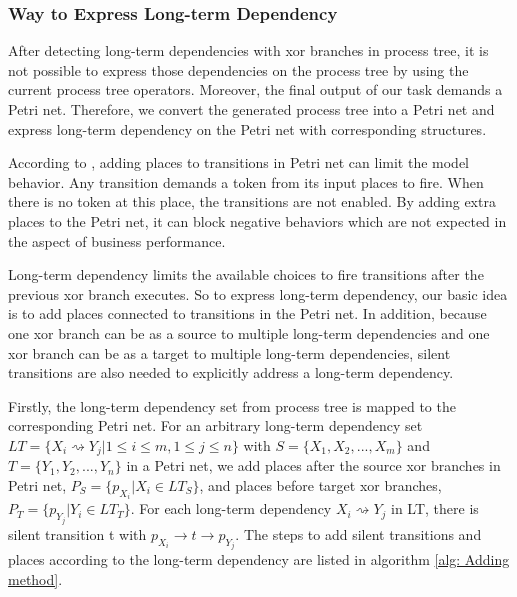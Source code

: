 \subsubsection{Way to Express Long-term Dependency}
After detecting long-term dependencies with xor branches in process tree, it is not possible to express those dependencies on the process tree by using the current process tree operators. Moreover, the final output of our task demands a Petri net. Therefore, we convert the generated process tree into a Petri net and express long-term dependency on the Petri net with corresponding structures.

According to \cite{bergenthum2007process}, adding places to transitions in Petri net can limit the model behavior. Any transition demands a token from its input places to fire. When there is no token at this place, the transitions are not enabled. By adding extra places to the Petri net, it can block negative behaviors which are not expected in the aspect of business performance. 

Long-term dependency limits the available choices to fire transitions after the previous xor branch executes. So to express long-term dependency, our basic idea is to add places connected to transitions in the Petri net. In addition, because one xor branch can be as a source to multiple long-term dependencies and one xor branch can be as a target to multiple long-term dependencies, silent transitions are also needed to explicitly address a long-term dependency. 


Firstly, the long-term dependency set from process tree is mapped to the corresponding Petri net. For an arbitrary long-term dependency set $LT=\{X_i \rightsquigarrow Y_j \vert 1 \leq i \leq m, 1 \leq j \leq n \}$ with $S=\{X_1,X_2,...,X_m\}$ and $T=\{Y_1,Y_2,...,Y_n\}$ in a Petri net, we add places after the source xor branches in Petri net,  $P_S=\{p_{X_i} \vert X_i \in LT_{S} \}$, and places before target xor branches,$P_T=\{p_{Y_j} \vert Y_i \in LT_{T} \}$. For each long-term dependency $X_{i} \rightsquigarrow Y_{j}$ in LT, there is silent transition t with $p_{X_i} \rightarrow t \rightarrow p_{Y_{j}}$. The steps to add silent transitions and places according to the long-term dependency are listed in algorithm \ref{alg: Adding method}.

